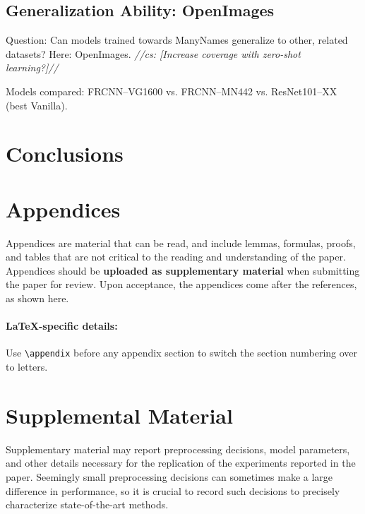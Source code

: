 \documentclass[11pt,a4paper]{article}
\newcommand{\cs}[1]{\textcolor{green!60!black}{\emph{//cs: #1//}}}
\newcommand{\mn}{ManyNames\xspace}
\begin{document}
\subsection{Generalization Ability: OpenImages}
\label{sect:exp_openimages}
Question: Can models trained towards \mn generalize to other, related datasets? Here: OpenImages. \cs{[Increase coverage with zero-shot learning?]}\

Models compared: FRCNN--VG1600 vs. FRCNN--MN442 vs. ResNet101--XX (best Vanilla).

\section{Conclusions}
\label{sec:conclusions}

%
%

\appendix

\section{Appendices}
\label{sec:appendix}
Appendices are material that can be read, and include lemmas, formulas, proofs, and tables that are not critical to the reading and understanding of the paper. 
Appendices should be \textbf{uploaded as supplementary material} when submitting the paper for review.
Upon acceptance, the appendices come after the references, as shown here.

\paragraph{\LaTeX-specific details:}
Use {\small\verb|\appendix|} before any appendix section to switch the section numbering over to letters.


\section{Supplemental Material}
\label{sec:supplemental}
Supplementary material may report preprocessing decisions, model parameters, and other details necessary for the replication of the experiments reported in the paper.
Seemingly small preprocessing decisions can sometimes make a large difference in performance, so it is crucial to record such decisions to precisely characterize state-of-the-art methods. 
\end{document}
